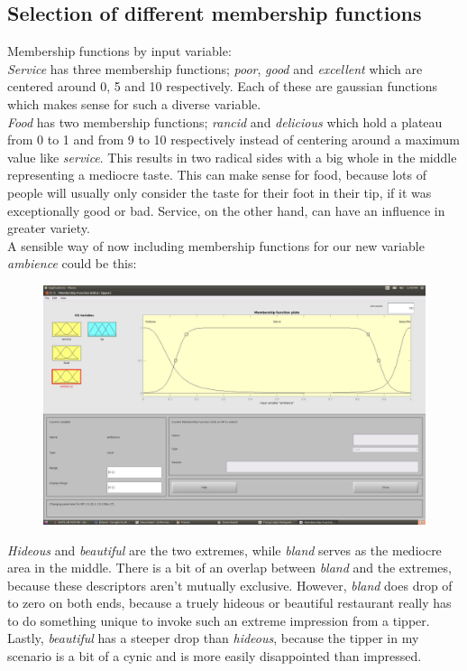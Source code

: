 \documentclass[a4paper, 11pt]{article}
\begin{document}
\subsection{Selection of different membership functions}
Membership functions by input variable:\\
\textit{Service} has three membership functions; \textit{poor}, \textit{good} and \textit{excellent} which are centered around 0, 5 and 10 respectively. Each of these are gaussian functions which makes sense for such a diverse variable.\\
\textit{Food} has two membership functions; \textit{rancid} and \textit{delicious} which hold a plateau from 0 to 1 and from 9 to 10 respectively instead of centering around a maximum value like \textit{service}. This results in two radical sides with a big whole in the middle representing a mediocre taste. This can make sense for food, because lots of people will usually only consider the taste for their foot in their tip, if it was exceptionally good or bad. Service, on the other hand, can have an influence in greater variety.\\
A sensible way of now including membership functions for our new variable \textit{ambience} could be this:

\begin{figure}[ht]
\includegraphics[scale=0.2]{ambience-mf-v2.jpg}
\end{figure}

\textit{Hideous} and \textit{beautiful} are the two extremes, while \textit{bland} serves as the mediocre area in the middle. There is a bit of an overlap between \textit{bland} and the extremes, because these descriptors aren't mutually exclusive. However, \textit{bland} does drop of to zero on both ends, because a truely hideous or beautiful restaurant really has to do something unique to invoke such an extreme impression from a tipper. Lastly, \textit{beautiful} has a steeper drop than \textit{hideous}, because the tipper in my scenario is a bit of a cynic and is more easily disappointed than impressed.
\end{document}
